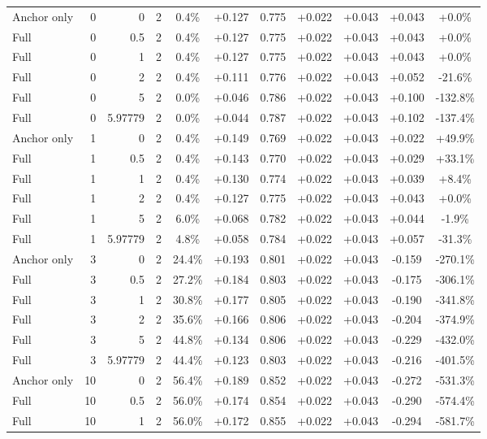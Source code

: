 \begin{table}[htbp]
\begin{tabular}{lrrrccccccc}
Anchor only & 0 & 0 & 2 & 0.4\% & +0.127 & 0.775 & +0.022 & +0.043 & +0.043 & +0.0\% \\
Full & 0 & 0.5 & 2 & 0.4\% & +0.127 & 0.775 & +0.022 & +0.043 & +0.043 & +0.0\% \\
Full & 0 & 1 & 2 & 0.4\% & +0.127 & 0.775 & +0.022 & +0.043 & +0.043 & +0.0\% \\
Full & 0 & 2 & 2 & 0.4\% & +0.111 & 0.776 & +0.022 & +0.043 & +0.052 & -21.6\% \\
Full & 0 & 5 & 2 & 0.0\% & +0.046 & 0.786 & +0.022 & +0.043 & +0.100 & -132.8\% \\
Full & 0 & 5.97779 & 2 & 0.0\% & +0.044 & 0.787 & +0.022 & +0.043 & +0.102 & -137.4\% \\
Anchor only & 1 & 0 & 2 & 0.4\% & +0.149 & 0.769 & +0.022 & +0.043 & +0.022 & +49.9\% \\
Full & 1 & 0.5 & 2 & 0.4\% & +0.143 & 0.770 & +0.022 & +0.043 & +0.029 & +33.1\% \\
Full & 1 & 1 & 2 & 0.4\% & +0.130 & 0.774 & +0.022 & +0.043 & +0.039 & +8.4\% \\
Full & 1 & 2 & 2 & 0.4\% & +0.127 & 0.775 & +0.022 & +0.043 & +0.043 & +0.0\% \\
Full & 1 & 5 & 2 & 6.0\% & +0.068 & 0.782 & +0.022 & +0.043 & +0.044 & -1.9\% \\
Full & 1 & 5.97779 & 2 & 4.8\% & +0.058 & 0.784 & +0.022 & +0.043 & +0.057 & -31.3\% \\
Anchor only & 3 & 0 & 2 & 24.4\% & +0.193 & 0.801 & +0.022 & +0.043 & -0.159 & -270.1\% \\
Full & 3 & 0.5 & 2 & 27.2\% & +0.184 & 0.803 & +0.022 & +0.043 & -0.175 & -306.1\% \\
Full & 3 & 1 & 2 & 30.8\% & +0.177 & 0.805 & +0.022 & +0.043 & -0.190 & -341.8\% \\
Full & 3 & 2 & 2 & 35.6\% & +0.166 & 0.806 & +0.022 & +0.043 & -0.204 & -374.9\% \\
Full & 3 & 5 & 2 & 44.8\% & +0.134 & 0.806 & +0.022 & +0.043 & -0.229 & -432.0\% \\
Full & 3 & 5.97779 & 2 & 44.4\% & +0.123 & 0.803 & +0.022 & +0.043 & -0.216 & -401.5\% \\
Anchor only & 10 & 0 & 2 & 56.4\% & +0.189 & 0.852 & +0.022 & +0.043 & -0.272 & -531.3\% \\
Full & 10 & 0.5 & 2 & 56.0\% & +0.174 & 0.854 & +0.022 & +0.043 & -0.290 & -574.4\% \\
Full & 10 & 1 & 2 & 56.0\% & +0.172 & 0.855 & +0.022 & +0.043 & -0.294 & -581.7\% \\

\end{tabular}
\end{table}
